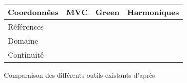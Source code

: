 \begin{figure}[h]
  \begin{center}
    \begin{tabular}{|l|c|c|c|}
      \hline
      Coordonnées & MVC & Green & Harmoniques \\
      \hline
      Références & & & \\
      \hline
      Domaine & & & \\
      \hline
      Continuité & & & \\
      \hline
    \end{tabular}
    \caption{Comparaison des différents outils existants d'après \cite{GB08}}
  \end{center}
\end{figure}


